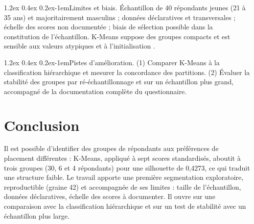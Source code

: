 \documentclass[11pt,a4paper]{article}
\makeatletter
\renewcommand\paragraph{\@startsection{paragraph}{4}{\z@}%
  {1.2ex \@plus 0.4ex \@minus 0.2ex}{-1em}{\normalfont\normalsize\bfseries}}
\makeatother
\begin{document}
\paragraph{Limites et biais.} Échantillon de 40 répondants jeunes (21 à 35 ans) et majoritairement masculins ; données déclaratives et transversales ; échelle des scores non documentée ; biais de sélection possible dans la constitution de l'échantillon. K-Means suppose des groupes compacts et est sensible aux valeurs atypiques et à l'initialisation \cite{jain2010}.

\paragraph{Pistes d'amélioration.} (1) Comparer K-Means à la classification hiérarchique \cite{ward1963} et mesurer la concordance des partitions. (2) Évaluer la stabilité des groupes par ré-échantillonnage et sur un échantillon plus grand, accompagné de la documentation complète du questionnaire.

\section{Conclusion}
\label{sec:conclusion}
Il est possible d'identifier des groupes de répondants aux préférences de placement différentes : K-Means, appliqué à sept scores standardisés, aboutit à trois groupes (30, 6 et 4 répondants) pour une silhouette de 0,4273, ce qui traduit une structure faible. Le travail apporte une première segmentation exploratoire, reproductible (graine 42) et accompagnée de ses limites : taille de l'échantillon, données déclaratives, échelle des scores à documenter. Il ouvre sur une comparaison avec la classification hiérarchique et sur un test de stabilité avec un échantillon plus large.
\end{document}
